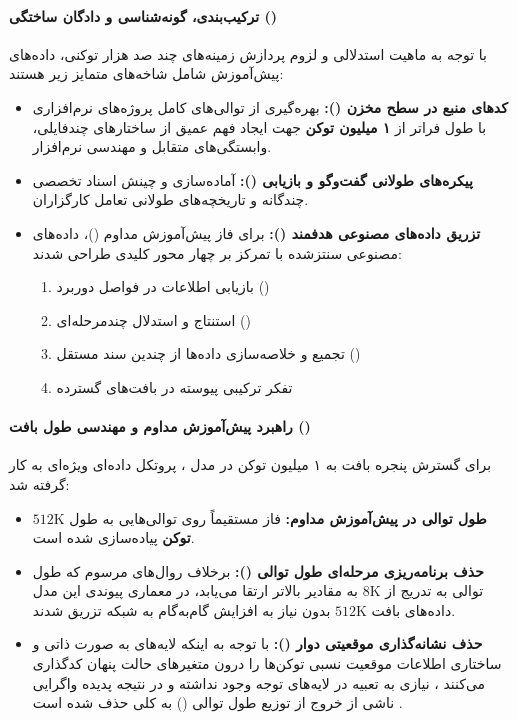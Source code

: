 \paragraph*{ترکیب‌بندی، گونه‌شناسی و دادگان ساختگی ()}
با توجه به ماهیت استدلالی و لزوم پردازش زمینه‌های چند صد هزار توکنی، داده‌های پیش‌آموزش شامل شاخه‌های متمایز زیر هستند:
\begin{itemize}
    \item \textbf{کدهای منبع در سطح مخزن ():} بهره‌گیری از توالی‌های کامل پروژه‌های نرم‌افزاری با طول فراتر از \textbf{۱ میلیون توکن} جهت ایجاد فهم عمیق از ساختارهای چندفایلی، وابستگی‌های متقابل و مهندسی نرم‌افزار.
    \item \textbf{پیکره‌های طولانی گفت‌وگو و بازیابی ():} آماده‌سازی و چینش اسناد تخصصی چندگانه و تاریخچه‌های طولانی تعامل کارگزاران.
    \item \textbf{تزریق داده‌های مصنوعی هدفمند ():} برای فاز پیش‌آموزش مداوم ()، داده‌های مصنوعی سنتزشده با تمرکز بر چهار محور کلیدی طراحی شدند:
    \begin{enumerate}
        \item بازیابی اطلاعات در فواصل دوربرد ()
        \item استنتاج و استدلال چندمرحله‌ای ()
        \item تجمیع و خلاصه‌سازی داده‌ها از چندین سند مستقل ()
        \item تفکر ترکیبی پیوسته در بافت‌های گسترده
    \end{enumerate}
\end{itemize}

\paragraph*{راهبرد پیش‌آموزش مداوم و مهندسی طول بافت ()}
برای گسترش پنجره بافت به ۱ میلیون توکن در مدل ، پروتکل داده‌ای ویژه‌ای به کار گرفته شد:
\begin{itemize}
    \item \textbf{طول توالی در پیش‌آموزش مداوم:} فاز  مستقیماً روی توالی‌هایی به طول \textbf{$512\text{K}$ توکن} پیاده‌سازی شده است.
    \item \textbf{حذف برنامه‌ریزی مرحله‌ای طول توالی ():} برخلاف روال‌های مرسوم که طول توالی به تدریج از $8\text{K}$ به مقادیر بالاتر ارتقا می‌یابد، در معماری پیوندی این مدل داده‌های بافت $512\text{K}$ بدون نیاز به افزایش گام‌به‌گام به شبکه تزریق شدند.
    \item \textbf{حذف نشانه‌گذاری موقعیتی دوار ():} با توجه به اینکه لایه‌های  به صورت ذاتی و ساختاری اطلاعات موقعیت نسبی توکن‌ها را درون متغیرهای حالت پنهان کدگذاری می‌کنند \cite{dao2024transformers}، نیازی به تعبیه  در لایه‌های توجه وجود نداشته و در نتیجه پدیده واگرایی ناشی از خروج از توزیع طول توالی () به کلی حذف شده است \cite{puvvada2025swan}.
\end{itemize}


